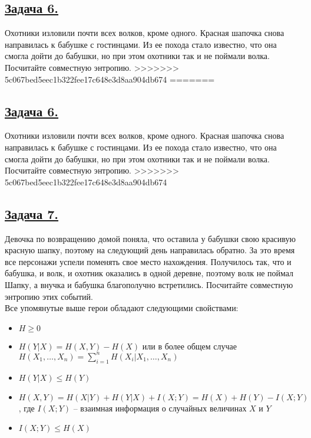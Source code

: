 \subsection*{\hyperref[sec:sol_problem6]{Задача 6.}}\label{sec:problem6}Охотники изловили почти всех волков, кроме одного. Красная шапочка снова направилась к бабушке с гостинцами. Из ее похода стало известно, что она смогла дойти до бабушки, но при этом охотники так и не поймали волка. Посчитайте совместную энтропию. 
>>>>>>> 5c067bed5eec1b322fee17c648e3d8aa904db674
=======
\subsection*{\hyperref[sec:sol_problem6]{Задача 6.}}\label{sec:problem6}Охотники изловили почти всех волков, кроме одного. Красная шапочка снова направилась к бабушке с гостинцами. Из ее похода стало известно, что она смогла дойти до бабушки, но при этом охотники так и не поймали волка. Посчитайте совместную энтропию. 
>>>>>>> 5c067bed5eec1b322fee17c648e3d8aa904db674

\subsection*{\hyperref[sec:sol_problem7]{Задача 7.}}\label{sec:problem7} Девочка по возвращению домой поняла, что оставила у бабушки свою красивую красную шапку, поэтому на следующий день направилась обратно. За это время все персонажи успели поменять свое место нахождения. Получилось так, что и бабушка, и волк, и охотник оказались в одной деревне, поэтому волк не поймал Шапку, а внучка и бабушка благополучно встретились. Посчитайте совместную энтропию этих событий. \\

Все упомянутые выше герои обладают следующими свойствами:

\begin{itemize}
    \item $H \geqslant 0$
    \item $H(Y|X)=H(X, Y)-H(X)$ или в более общем случае $H(X_1, \ldots, X_n)=\sum\limits_{i=1}^n H(X_i|X_1, \ldots, X_n)$
    \item $H(Y|X)\leqslant H(Y)$
    \item $H(X, Y)=H(X|Y)+H(Y|X)+I(X; Y)=H(X)+H(Y)-I(X; Y)$, где $I(X; Y)$ -- взаимная информация о случайных величинах $X$ и $Y$
    \item $I(X; Y)\leqslant H(X)$
\end{itemize}

